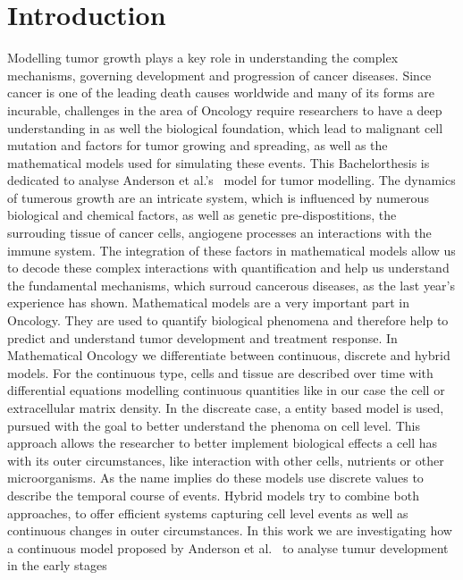 \section{Introduction}
Modelling tumor growth plays a key role in understanding the complex mechanisms, 
governing development and progression of cancer diseases. Since cancer is one of the 
leading death causes worldwide and many of its forms are incurable, challenges in the area of 
Oncology require researchers to have a deep understanding in as well the biological foundation, 
which lead to malignant cell mutation and factors for tumor growing and spreading, as well as the 
mathematical models used for simulating these events. This Bachelorthesis is dedicated to 
analyse Anderson et al.'s~\cite{anderson_continuous_1998,anderson_mathematical_2000} model for 
tumor modelling.\newline
The dynamics of tumerous growth are an intricate system, which is influenced by numerous biological and 
chemical factors, as well as genetic pre-dispostitions, the surrouding tissue of cancer cells, angiogene 
processes an interactions with the immune system. The integration of these factors in mathematical models
allow us to decode these complex interactions with quantification and help us understand the fundamental 
mechanisms, which surroud cancerous diseases, as the last year's experience has shown. \newline 
Mathematical models are a very important part in Oncology. They are used to quantify biological phenomena and therefore help to predict and understand tumor development and treatment response. In Mathematical Oncology we differentiate between continuous, discrete and hybrid models. For the continuous type, cells and tissue are described over time with differential equations modelling continuous quantities like in our case the cell or extracellular matrix density. In the discreate case, a entity based model is used, pursued with the goal to better understand the phenoma on cell level. This approach allows the researcher to better implement biological effects a cell has with its outer circumstances, like interaction with other cells, nutrients or other microorganisms. As the name implies do these models use discrete values to describe the temporal course of events. Hybrid models try to combine both approaches, to offer efficient systems capturing cell level events as well as continuous changes in outer circumstances.\newline 
In this work we are investigating how a continuous model proposed by Anderson et al.~\cite{anderson_continuous_1998,anderson_mathematical_2000} to analyse tumur development in the early stages

